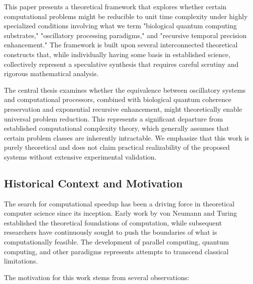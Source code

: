 \documentclass[12pt,a4paper]{article}
\theoremstyle{definition}
\begin{document}
This paper presents a theoretical framework that explores whether certain computational problems might be reducible to unit time complexity under highly specialized conditions involving what we term "biological quantum computing substrates," "oscillatory processing paradigms," and "recursive temporal precision enhancement." The framework is built upon several interconnected theoretical constructs that, while individually having some basis in established science, collectively represent a speculative synthesis that requires careful scrutiny and rigorous mathematical analysis.

The central thesis examines whether the equivalence between oscillatory systems and computational processors, combined with biological quantum coherence preservation and exponential recursive enhancement, might theoretically enable universal problem reduction. This represents a significant departure from established computational complexity theory, which generally assumes that certain problem classes are inherently intractable. We emphasize that this work is purely theoretical and does not claim practical realizability of the proposed systems without extensive experimental validation.

\subsection{Historical Context and Motivation}

The search for computational speedup has been a driving force in theoretical computer science since its inception. Early work by von Neumann and Turing established the theoretical foundations of computation, while subsequent researchers have continuously sought to push the boundaries of what is computationally feasible. The development of parallel computing, quantum computing, and other paradigms represents attempts to transcend classical limitations.

The motivation for this work stems from several observations:
\end{document}
